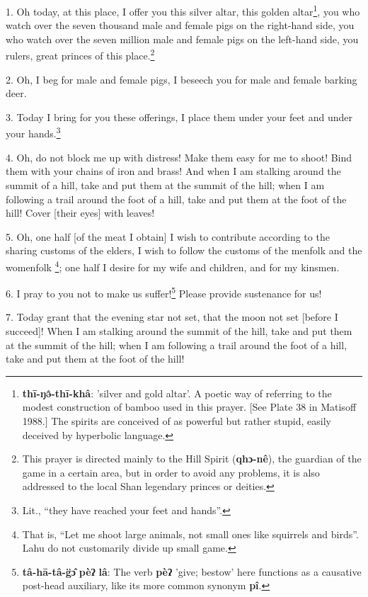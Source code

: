 \setcounter{footnote}{0}

1. Oh today, at this place, I offer you this silver altar, this golden altar\footnote{\textbf{thī-ŋə̂-thī-khâ}: 'silver and gold altar'. A poetic way of referring to the modest construction of bamboo used in this prayer. [See Plate 38 in Matisoff 1988.] The spirits are conceived of as powerful but rather stupid, easily deceived by hyperbolic language.},
you who watch over the seven thousand male and female pigs on the right-hand side,
you who watch over the seven million male and female pigs on the left-hand side,
you rulers, great princes of this place.\footnote{This prayer is directed mainly to the Hill Spirit (\textbf{qhɔ-nê}), the guardian of the game in a certain area, but in order to avoid any problems, it is also addressed to the local Shan legendary princes or deities.}

2. Oh, I beg for male and female pigs, I beseech you for male and female barking
deer.

3. Today I bring for you these offerings, I place them under your feet and under
your hands.\footnote{Lit., ``they have reached your feet and hands''.}

4. Oh, do not block me up with distress! Make them easy for me to shoot! Bind them
with your chains of iron and brass! And when I am stalking around the summit of
a hill, take and put them at the summit of the hill; when I am following a trail
around the foot of a hill, take and put them at the foot of the hill! Cover [their
eyes] with leaves!

5. Oh, one half [of the meat I obtain] I wish to contribute according to the sharing
customs of the elders, I wish to follow the customs of the menfolk and the womenfolk
\footnote{That is, ``Let me shoot large animals, not small ones like squirrels and birds''. Lahu do not customarily divide up small game.}; one half I desire for my wife and children, and for my kinsmen.

6. I pray to you not to make us suffer!\footnote{\textbf{tâ-hā-tâ-g̈ɔ̂} \textbf{pèʔ} \textbf{lâ}: The verb \textbf{pèʔ} 'give; bestow' here functions as a causative post-head auxiliary, like its more common synonym \textbf{pî}.} Please provide sustenance for us!

7. Today grant that the evening star not set, that the moon not set [before I succeed]!
When I am stalking around the summit of the hill, take and put them at the summit
of the hill; when I am following a trail around the foot of a hill, take and put
them at the foot of the hill!

